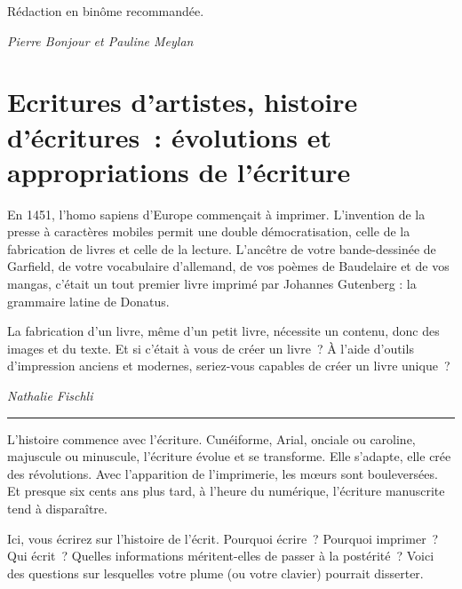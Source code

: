 \documentclass[
  10pt,
  french,
  a5paper,
  openany]{book}
\newenvironment{signature}{\begin{flushright}}{\end{flushright}}
\begin{document}
Rédaction en binôme recommandée.

\begin{signature}
\emph{Pierre Bonjour et Pauline Meylan}

\end{signature}

\hypertarget{ecritures-dartistes-histoire-duxe9critures-uxe9volutions-et-appropriations-de-luxe9criture}{%
\chapter{\texorpdfstring{Ecritures d'artistes, histoire d'écritures~: \linebreak évolutions et appropriations de l'écriture}{Ecritures d'artistes, histoire d'écritures~: évolutions et appropriations de l'écriture}}\label{ecritures-dartistes-histoire-duxe9critures-uxe9volutions-et-appropriations-de-luxe9criture}}

En 1451, l'homo sapiens d'Europe commençait à imprimer. L'invention de la presse à caractères mobiles permit une double démocratisation, celle de la fabrication de livres et celle de la lecture. L'ancêtre de votre bande-dessinée de Garfield, de votre vocabulaire d'allemand, de vos poèmes de Baudelaire et de vos mangas, c'était un tout premier livre imprimé par Johannes Gutenberg : la grammaire latine de Donatus.

La fabrication d'un livre, même d'un petit livre, nécessite un contenu, donc des images et du texte. Et si c'était à vous de créer un livre~? À l'aide d'outils d'impression anciens et modernes, seriez-vous capables de créer un livre unique~?

\begin{signature}
\emph{Nathalie Fischli}

\end{signature}

\begin{center}\rule{0.5\linewidth}{0.5pt}\end{center}

L'histoire commence avec l'écriture. Cunéiforme, Arial, onciale ou caroline, majuscule ou minuscule, l'écriture évolue et se transforme. Elle s'adapte, elle crée des révolutions. Avec l'apparition de l'imprimerie, les mœurs sont bouleversées. Et presque six cents ans plus tard, à l'heure du numérique, l'écriture manuscrite tend à disparaître.

Ici, vous écrirez sur l'histoire de l'écrit. Pourquoi écrire~? Pourquoi imprimer~? Qui écrit~? Quelles informations méritent-elles de passer à la postérité~? Voici des questions sur lesquelles votre plume (ou votre clavier) pourrait disserter.
\end{document}
